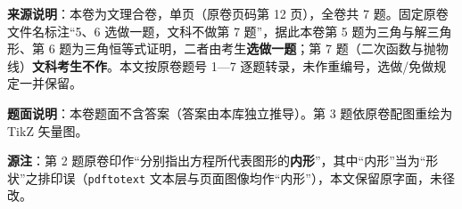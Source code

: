 

\begin{gktip}
\textbf{来源说明}：本卷为文理合卷，单页（原卷页码第 12 页），全卷共 7 题。固定原卷文件名标注“5、6 选做一题，文科不做第 7 题”，据此本卷第 5 题为三角与解三角形、第 6 题为三角恒等式证明，二者由考生\textbf{选做一题}；第 7 题（二次函数与抛物线）\textbf{文科考生不作}。本文按原卷题号 1—7 逐题转录，未作重编号，选做/免做规定一并保留。

\textbf{题面说明}：本卷题面不含答案（答案由本库独立推导）。第 3 题依原卷配图重绘为 TikZ 矢量图。

\textbf{源注}：第 2 题原卷印作“分别指出方程所代表图形的\textbf{内形}”，其中“内形”当为“形状”之排印误（\texttt{pdftotext} 文本层与页面图像均作“内形”），本文保留原字面，未径改。
\end{gktip}


